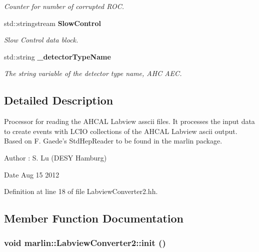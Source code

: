 \begin{DoxyCompactItemize}
\begin{DoxyCompactList}\small\item\em Counter for number of corrupted ROC. \item\end{DoxyCompactList}\item 
std::stringstream {\bf SlowControl}\label{classmarlin_1_1LabviewConverter2_ab042338dff0484ca2b443b04b548e190}

\begin{DoxyCompactList}\small\item\em Slow Control data block. \item\end{DoxyCompactList}\item 
std::string {\bf \_\-detectorTypeName}\label{classmarlin_1_1LabviewConverter2_a856b33e1b7efb3a11e3e1f3d857edcc4}

\begin{DoxyCompactList}\small\item\em The string variable of the detector type name, AHC AEC. \item\end{DoxyCompactList}\end{DoxyCompactItemize}


\subsection{Detailed Description}
Processor for reading the AHCAL Labview asscii files. It processes the input data to create events with LCIO collections of the AHCAL Labview ascii output. Based on F. Gaede's StdHepReader to be found in the marlin package. \begin{DoxyAuthor}{Author}
: S. Lu (DESY Hamburg) 
\end{DoxyAuthor}
\begin{DoxyDate}{Date}
Aug 15 2012 
\end{DoxyDate}


Definition at line 18 of file LabviewConverter2.hh.

\subsection{Member Function Documentation}
\subsubsection[{init}]{\setlength{\rightskip}{0pt plus 5cm}void marlin::LabviewConverter2::init ()\hspace{0.3cm}{\ttfamily  [virtual]}}\label{classmarlin_1_1LabviewConverter2_a69acbbef280d0aa78c058bc43bb7cc2d}


